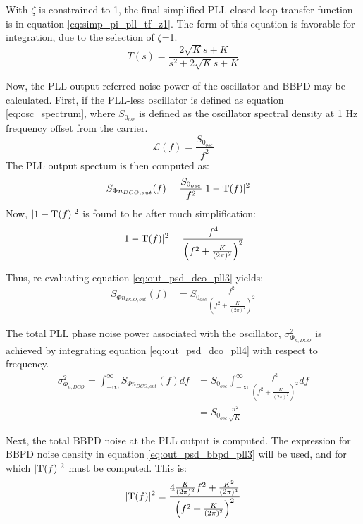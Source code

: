			\FloatBarrier
			With $\zeta$ is constrained to 1, the final simplified PLL closed loop transfer function is in equation \ref{eq:simp_pi_pll_tf_z1}. The form of this equation is favorable for integration, due to the selection of $\zeta$=1.
			\begin{equation} \label{eq:simp_pi_pll_tf_z1}
				T(s) = \frac{2\sqrt{K}s + K }{s^2 + 2\sqrt{K}s + K}
			\end{equation}
			
			Now, the PLL output referred noise power of the oscillator and BBPD may be calculated. First, if the PLL-less oscillator is defined as equation \ref{eq:osc_spectrum}, where $S_{0_{osc}}$ is defined as the oscillator spectral density at 1 Hz frequency offset from the carrier. 
			\begin{equation}\label{eq:osc_spectrum} 
				\mathcal{L}(f) = \frac{S_{0_{osc}}}{f^2} 
			\end{equation} 
			The PLL output spectum is then computed as: 
			\begin{align}\label{eq:out_psd_dco_pll3} 
				S_{\Phi n_{DCO,out}}(f) &= \frac{S_{0_{osc}}}{f^2}|1-\textnormal{T}(f)|^2  
			\end{align} Now, $|1-\textnormal{T}(f)|^2$ is found to be after much simplification:
			\begin{equation} |1-\textnormal{T}(f)|^2 =
				\frac{f^4}{\left(f^2+\frac{K}{(2\pi)^2}\right)^2} 
			\end{equation} 

			Thus, re-evaluating equation \ref{eq:out_psd_dco_pll3} yields:
			\begin{align}\label{eq:out_psd_dco_pll4} 
				S_{\Phi n_{DCO,out}}(f) &= S_{0_{osc}}\frac{f^2}{\left(f^2+\frac{K}{(2\pi)^2}\right)^2} 
			\end{align} 

			The total PLL phase noise power associated with the oscillator, $\sigma_{\Phi_{n,DCO}}^2$ is achieved by integrating equation \ref{eq:out_psd_dco_pll4} with respect to frequency.
			\begin{align}\label{eq:out_psd_dco_pll4} \sigma_{\Phi_{n,DCO}}^2 =
				\int_{-\infty}^{\infty} S_{\Phi n_{DCO,out}}(f)df &=
				S_{0_{osc}}\int_{-\infty}^{\infty}\frac{f^2}{\left(f^2+\frac{K}{(2\pi)^2}\right)^2}df
				\\ &= S_{0_{osc}}\frac{\pi^2}{\sqrt{K}} 
			\end{align} 

			Next, the total BBPD noise at the PLL output is computed. The expression for BBPD noise density in equation \ref{eq:out_psd_bbpd_pll3} will be used, and for which $|\textnormal{T}(f)|^2$ must be computed. This is: 
			\begin{equation} 
				|\textnormal{T}(f)|^2 =
				\frac{4\frac{K}{(2\pi)^2}f^2 +
				\frac{K^2}{(2\pi)^4}}{\left(f^2+\frac{K}{(2\pi)^2}\right)^2} 
			\end{equation}

